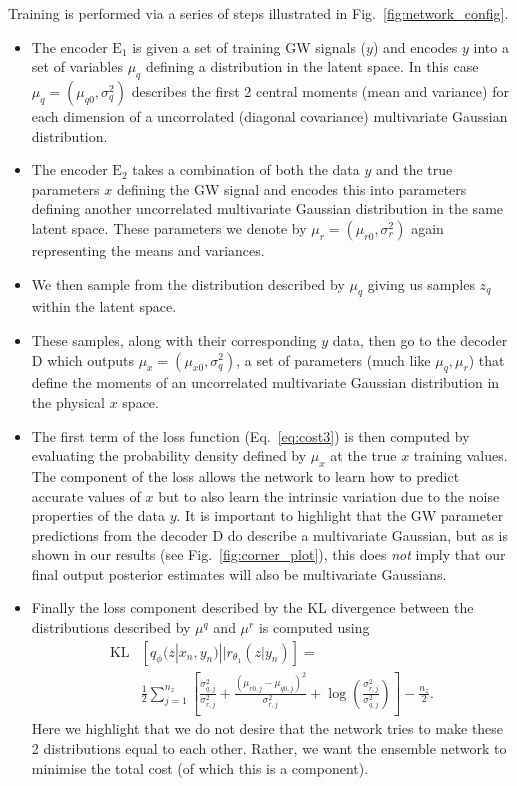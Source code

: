 %
%
Training is performed via a series of steps illustrated in
Fig.~\ref{fig:network_config}.
%
\begin{itemize}
%
\item The encoder $\textrm{E}_1$ is given a set of training \ac{GW} signals
($y$) and encodes $y$ into a set of variables $\mu_q$ defining a distribution
in the latent space. In this case $\mu_q = (\mu_{q0},\sigma^{2}_{q})$ describes
the first 2 central moments (mean and variance) for each dimension of a
uncorrolated (diagonal covariance) multivariate Gaussian distribution.
%
\item The encoder $\textrm{E}_2$ takes a combination of both the data $y$ and
the true parameters $x$ defining the \ac{GW} signal and encodes this into
parameters defining another uncorrelated multivariate Gaussian distribution in
the same latent space. These parameters we denote by
$\mu_{r}=(\mu_{r0},\sigma^{2}_{r})$ again representing the means and variances.
%
\item We then sample from the distribution described by $\mu_{q}$ giving us
samples $z_{q}$ within the latent space.
%
\item These samples, along with their corresponding $y$ data, then go to the
decoder D which outputs $\mu_{x}=(\mu_{x0},\sigma^{2}_{q})$, a set of parameters (much like
$\mu_q,\mu_r$) that define the moments of an uncorrelated  multivariate Gaussian
distribution in the physical $x$ space.
\item The first term of the loss function (Eq.~\ref{eq:cost3}) is then computed
by evaluating the probability density defined by $\mu_x$ at the true $x$
training values. The component of the loss allows the network to learn how to
predict accurate values of $x$ but to also learn the intrinsic variation due to
the noise properties of the data $y$. It is important to highlight that the
\ac{GW} parameter predictions from the decoder D do describe a multivariate
Gaussian, but as is shown in our results (see Fig.~\ref{fig:corner_plot}), this
does \emph{not} imply that our final output posterior estimates will also be
multivariate Gaussians.
%
\item Finally the loss component described by the \ac{KL} divergence between the
distributions described by $\mu^{q}$ and $\mu^{r}$ is computed using
%
\begin{align}\label{eq:klgauss}
\text{KL}&\left[q_{\phi}(z|x_{n},y_{n})||r_{\theta_{1}}(z|y_{n})\right] = \\
&\frac{1}{2}\sum_{j=1}^{n_{z}}\left[\frac{\sigma_{q,j}^{2}}{\sigma_{r,j}^{2}} +
\frac{(\mu_{r0,j}-\mu_{q0,j})^{2}}{\sigma_{r,j}^{2}}+
\log\left(\frac{\sigma_{r,j}^{2}}{\sigma_{q,j}^{2}}\right)\right] -
\frac{n_{z}}{2}.\nonumber 
\end{align}
%
Here we highlight that we do not desire that the network tries to make these 2
distributions equal to each other. Rather, we want the ensemble network to
minimise the total cost (of which this is a component).
%
\end{itemize}

